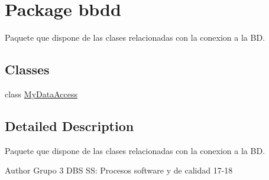 \hypertarget{namespacebbdd}{}\section{Package bbdd}
\label{namespacebbdd}


Paquete que dispone de las clases relacionadas con la conexion a la BD.  


\subsection*{Classes}
\begin{DoxyCompactItemize}
\item 
class \hyperlink{classbbdd_1_1_my_data_access}{My\+Data\+Access}
\end{DoxyCompactItemize}


\subsection{Detailed Description}
Paquete que dispone de las clases relacionadas con la conexion a la BD. 

\begin{DoxyAuthor}{Author}
Grupo 3 D\+BS SS\+: Procesos software y de calidad 17-\/18 
\end{DoxyAuthor}
